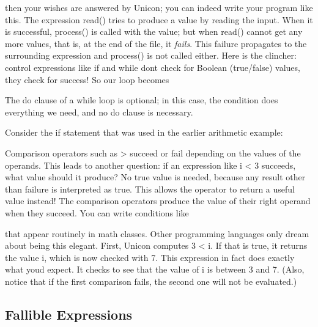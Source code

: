 
\noindent
then your wishes are answered by Unicon; you can indeed write your
program like this. The expression \textsf{read()} tries to produce a
value by reading the input. When it is successful, \textsf{process()}
is called with the value; but when \textsf{read()} cannot get any more
values, that is, at the end of the file, it \textit{fails}. This
failure propagates to the surrounding expression and \textsf{process()}
is not called either. Here is the clincher: control expressions like
\textsf{if} and \textsf{while} don{\textquotesingle}t check for Boolean
(true/false) values, they check for success! So our loop
becomes


The \textsf{do} clause of a \textsf{while} loop is
optional; in this case, the condition does everything
we need, and no \textsf{do} clause is necessary.

Consider the \textsf{if}\textsf{ }statement that was
used in the earlier arithmetic example:


Comparison operators such as \textsf{{\textgreater}} succeed or fail
depending on the values of the operands. This leads to another
question: if an expression like \textsf{i {\textless} 3} succeeds, what
value should it produce? No {\textquotedbl}true{\textquotedbl} value is
needed, because any result other than failure is interpreted as
{\textquotedbl}true.{\textquotedbl} This allows the operator to return
a useful value instead! The comparison
operators produce the value of their right operand when they succeed.
You can write conditions like


\noindent
that appear routinely in math classes. Other programming languages only
dream about being this elegant. First, Unicon computes \textsf{3
{\textless} i}. If that is true, it returns the value \textsf{i}, which
is now checked with 7. This expression in fact does exactly what
you{\textquotesingle}d expect. It checks to see that the value of
\textsf{i} is between 3 and 7. (Also, notice that if the first
comparison fails, the second one will not be evaluated.)

\subsection{Fallible Expressions}

